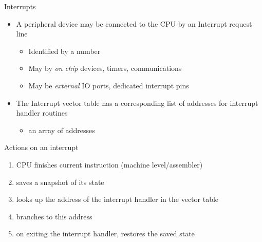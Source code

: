 \documentclass[svgnames,x11names]{beamer}
\begin{document}
\begin{frame}{Interrupts}
  \begin{itemize}
  \item A peripheral device may be connected to the CPU by an
    \alert{Interrupt request} line
    \begin{itemize}
    \item Identified by a number
    \item May by \emph{on chip} devices, timers, communications
    \item May be \emph{external} IO ports, dedicated interrupt pins
    \end{itemize}
  \item The \alert{Interrupt vector table} has a corresponding list of
    addresses for interrupt handler routines
    \begin{itemize}
    \item an array of addresses
    \end{itemize}
  \end{itemize}

  \begin{block}{Actions on an interrupt}
    \begin{enumerate}
    \item CPU finishes current instruction (machine level/assembler)
    \item saves a snapshot of its state
    \item looks up the address of the interrupt handler in the vector
      table
    \item branches to this address
    \item on exiting the interrupt handler, restores the saved state
    \end{enumerate}
  \end{block}
\end{frame}
\end{document}
